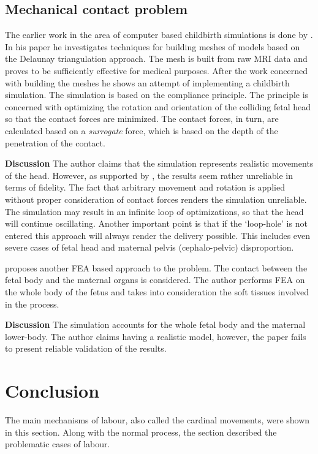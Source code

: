 \subsection{Mechanical contact problem}
The earlier work in the area of computer based childbirth simulations is done by \textbf{\citet{GEIGER}}. In his paper he investigates techniques for building meshes of models based on the Delaunay triangulation approach. The mesh is built from raw MRI data and proves to be sufficiently effective for medical purposes. After the work concerned with building the meshes he shows an attempt of implementing a childbirth simulation. The simulation is based on the compliance principle. The principle is concerned with optimizing the rotation and orientation of the colliding fetal head so that the contact forces are minimized. The contact forces, in turn, are calculated based on a \textit{surrogate} force, which is based on the depth of the penetration of the contact.

\textbf{Discussion} The author claims that the simulation represents realistic movements of the head. However, as supported by \citet{RUDYPHD}, the results seem rather unreliable in terms of fidelity. The fact that arbitrary movement and rotation is applied without proper consideration of contact forces renders the simulation unreliable. The simulation may result in an infinite loop of optimizations, so that the head will continue oscillating. Another important point is that if the `loop-hole' is not entered this approach will always render the delivery possible. This includes even severe cases of fetal head and maternal pelvis (cephalo-pelvic) disproportion.

\textbf{\citet{Wischnik}} proposes another FEA based approach to the problem. The contact between the fetal body and the maternal organs is considered. The author performs FEA on the whole body of the fetus and takes into consideration the soft tissues involved in the process.

\textbf{Discussion} The simulation accounts for the whole fetal body and the maternal lower-body. The author claims having a realistic model, however, the paper fails to present reliable validation of the results.

\section{Conclusion}

The main mechanisms of labour, also called the cardinal movements, were shown in this section. Along with the normal process, the section described the problematic cases of labour.

